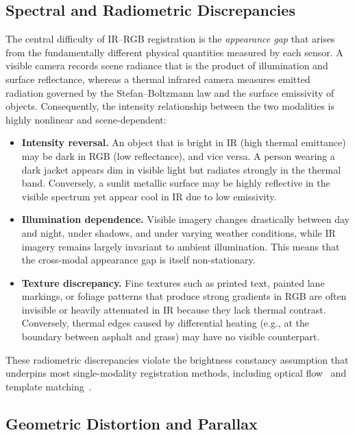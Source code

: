 \subsection{Spectral and Radiometric Discrepancies}
\label{subsec:spectral}

The central difficulty of IR--RGB registration is the \emph{appearance gap}
that arises from the fundamentally different physical quantities measured by
each sensor. A visible camera records scene radiance that is the product of
illumination and surface reflectance, whereas a thermal infrared camera measures
emitted radiation governed by the Stefan--Boltzmann law and the surface
emissivity of objects. Consequently, the intensity relationship between the two
modalities is highly nonlinear and scene-dependent:

\begin{itemize}
  \item \textbf{Intensity reversal.} An object that is bright in IR (high
    thermal emittance) may be dark in RGB (low reflectance), and vice versa. A
    person wearing a dark jacket appears dim in visible light but radiates
    strongly in the thermal band. Conversely, a sunlit metallic surface may be
    highly reflective in the visible spectrum yet appear cool in IR due to low
    emissivity.
  \item \textbf{Illumination dependence.} Visible imagery changes drastically
    between day and night, under shadows, and under varying weather conditions,
    while IR imagery remains largely invariant to ambient illumination. This
    means that the cross-modal appearance gap is itself non-stationary.
  \item \textbf{Texture discrepancy.} Fine textures such as printed text,
    painted lane markings, or foliage patterns that produce strong gradients in
    RGB are often invisible or heavily attenuated in IR because they lack
    thermal contrast. Conversely, thermal edges caused by differential heating
    (e.g., at the boundary between asphalt and grass) may have no visible
    counterpart.
\end{itemize}

These radiometric discrepancies violate the brightness constancy assumption
that underpins most single-modality registration methods, including optical
flow~\cite{horn1981determining} and template matching~\cite{lewis1995fast}.

\subsection{Geometric Distortion and Parallax}
\label{subsec:geometric}

